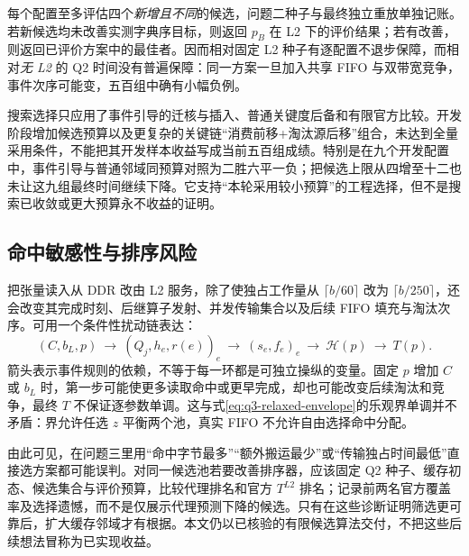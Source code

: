 每个配置至多评估四个\emph{新增且不同}的候选，问题二种子与最终独立重放单独记账。若新候选均未改善实测字典序目标，则返回 $p_B$ 在 L2 下的评价结果；若有改善，则返回已评价方案中的最佳者。因而相对固定 L2 种子有逐配置不退步保障，而相对\emph{无 L2} 的 Q2 时间没有普遍保障：同一方案一旦加入共享 FIFO 与双带宽竞争，事件次序可能变，五百组中确有小幅负例。

搜索选择只应用了事件引导的迁核与插入、普通关键度后备和有限官方比较。开发阶段增加候选预算以及更复杂的关键链“消费前移+淘汰源后移”组合，未达到全量采用条件，不能把其开发样本收益写成当前五百组成绩。特别是在九个开发配置中，事件引导与普通邻域同预算对照为二胜六平一负；把候选上限从四增至十二也未让这九组最终时间继续下降。它支持“本轮采用较小预算”的工程选择，但不是搜索已收敛或更大预算永不收益的证明。

\subsection{命中敏感性与排序风险}
把张量读入从 DDR 改由 L2 服务，除了使独占工作量从 $\lceil b/60\rceil$ 改为 $\lceil b/250\rceil$，还会改变其完成时刻、后继算子发射、并发传输集合以及后续 FIFO 填充与淘汰次序。可用一个条件性扰动链表达：
\begin{equation}\label{eq:q3-causal-chain}
(C,b_L,p)\ \longrightarrow\
(Q_j,h_e,r(e))_{e}\ \longrightarrow\
(s_e,f_e)_{e}\ \longrightarrow\
\mathcal H(p)\ \longrightarrow\ T(p).
\end{equation}
箭头表示事件规则的依赖，不等于每一环都是可独立操纵的变量。固定 $p$ 增加 $C$ 或 $b_L$ 时，第一步可能使更多读取命中或更早完成，却也可能改变后续淘汰和竞争，最终 $T$ 不保证逐参数单调。这与式\eqref{eq:q3-relaxed-envelope}的乐观界单调并不矛盾：界允许任选 $z$ 平衡两个池，真实 FIFO 不允许自由选择命中分配。

由此可见，在问题三里用“命中字节最多”“额外搬运最少”或“传输独占时间最低”直接选方案都可能误判。对同一候选池若要改善排序器，应该固定 Q2 种子、缓存初态、候选集合与评价预算，比较代理排名和官方 $T^{L2}$ 排名；记录前两名官方覆盖率及选择遗憾，而不是仅展示代理预测下降的候选。只有在这些诊断证明筛选更可靠后，扩大缓存邻域才有根据。本文仍以已核验的有限候选算法交付，不把这些后续想法冒称为已实现收益。
